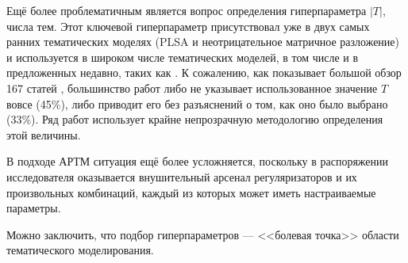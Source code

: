 Ещё более проблематичным является вопрос определения гиперпараметра $|T|$, числа тем. Этот ключевой гиперпараметр присутствовал уже в двух самых ранних тематических моделях (PLSA и неотрицательное матричное разложение) и используется в широком числе тематических моделей, в том числе и в предложенных недавно, таких как \cite{zosa-granroth-wilding-2019-multilingual}. К сожалению, как показывает большой обзор 167 статей \cite{chen2016survey}, большинство работ либо не указывает использованное значение $T$ вовсе (45\%), либо приводит его без разъяснений о том, как оно было выбрано (33\%). Ряд работ использует крайне непрозрачную методологию определения этой величины.

В подходе АРТМ ситуация ещё более усложняется, поскольку в распоряжении исследователя оказывается внушительный арсенал регуляризаторов и их произвольных комбинаций, каждый из которых может иметь настраиваемые параметры.

Можно заключить, что подбор гиперпараметров --- <<болевая точка>> области тематического моделирования.



